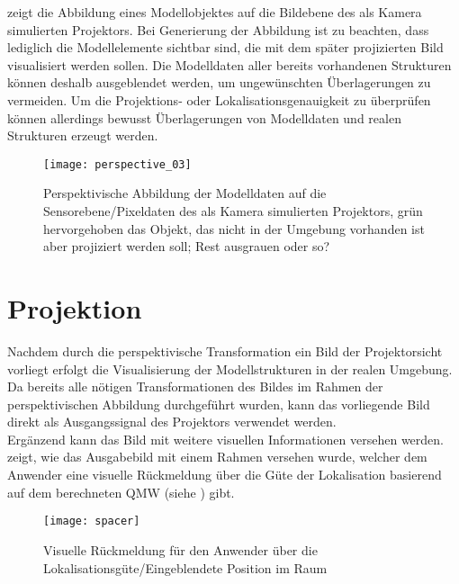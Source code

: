  zeigt die Abbildung eines Modellobjektes auf die Bildebene des als Kamera simulierten Projektors.  Bei Generierung der Abbildung ist zu beachten, dass lediglich die Modellelemente sichtbar sind, die mit dem später projizierten Bild visualisiert werden sollen. Die Modelldaten aller bereits vorhandenen Strukturen können deshalb ausgeblendet werden, um ungewünschten Überlagerungen zu vermeiden. Um die Projektions- oder Lokalisationsgenauigkeit zu überprüfen können allerdings bewusst Überlagerungen von Modelldaten und realen Strukturen erzeugt werden.

\begin{figure}[!ht]
	\begin{center}
		\texttt{[image: perspective\_03]}
		\caption{Perspektivische Abbildung der Modelldaten auf die Sensorebene/Pixeldaten des als Kamera simulierten Projektors, grün hervorgehoben das Objekt, das nicht in der Umgebung vorhanden ist aber projiziert werden soll; Rest ausgrauen oder so?}
		\label{fig.perspproj_vtk}
	\end{center}
\end{figure}


\section{Projektion}
Nachdem durch die perspektivische Transformation ein Bild der Projektorsicht vorliegt erfolgt die Visualisierung der Modellstrukturen in der realen Umgebung. Da bereits alle nötigen Transformationen des Bildes im Rahmen der perspektivischen Abbildung durchgeführt wurden, kann das vorliegende Bild direkt als Ausgangssignal des Projektors verwendet werden.\\
Ergänzend kann das Bild mit weitere visuellen Informationen versehen werden.  zeigt, wie das Ausgabebild mit einem Rahmen versehen wurde, welcher dem Anwender eine visuelle Rückmeldung über die Güte der Lokalisation basierend auf dem berechneten QMW (siehe ) gibt.\\


\begin{figure}[!ht]
	\begin{center}
		\texttt{[image: spacer]}
		\caption{Visuelle Rückmeldung für den Anwender über die Lokalisationsgüte/Eingeblendete Position im Raum}
		\label{fig.proj_rms}
	\end{center}
\end{figure}

